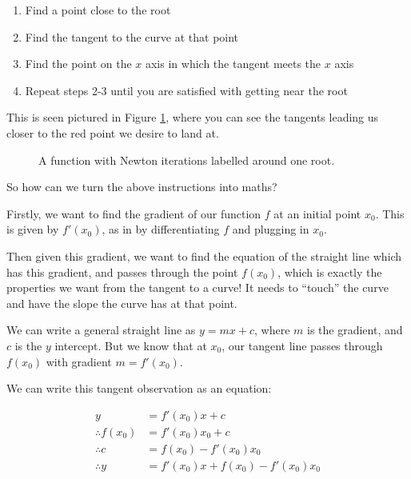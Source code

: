 \begin{enumerate}
    \item Find a point close to the root 
    \item Find the tangent to the curve at that point 
    \item Find the point on the $x$ axis in which the tangent meets the $x$ axis 
    \item Repeat steps 2-3 until you are satisfied with getting near the root
\end{enumerate}

This is seen pictured in Figure \ref{fig:function-with-newton-iterations-labelled}, where you can see the tangents leading us closer to the red point we desire to land at.

\begin{figure}[H]
\centering
{}
\caption{A function with Newton iterations labelled around one root.}
\label{fig:function-with-newton-iterations-labelled}
\end{figure}

So how can we turn the above instructions into maths?

Firstly, we want to find the gradient of our function $f$ at an initial point $x_0$. This is given by $f'(x_0)$, as in by differentiating $f$ and plugging in $x_0$.

Then given this gradient, we want to find the equation of the straight line which has this gradient, and passes through the point $f(x_0)$, which is exactly the properties we want from 
the tangent to a curve! It needs to ``touch'' the curve and have the slope the curve has at that point.

We can write a general straight line as $y = mx + c$, where $m$ is the gradient, and $c$ is the $y$ intercept. But we know that at $x_0$, our tangent line passes through $f(x_0)$ with gradient $m=f'(x_0)$.

We can write this tangent observation as an equation:

\begin{align*}
    y &= f'(x_0) x +c \tag{our equation for the tangent line}\\
    \therefore f(x_0) &= f'(x_0)x_0 + c \tag{using our observations above}\\
    \therefore c &= f(x_0) - f'(x_0)x_0 \tag{rearranging}\\
    \therefore y &= f'(x_0)x + f(x_0) - f'(x_0)x_0 \tag{subbing into original equation}
\end{align*}


